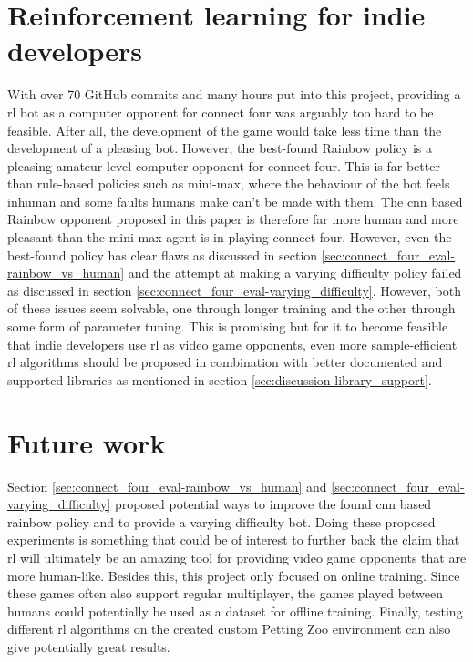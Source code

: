 \section{Reinforcement learning for indie developers}
\label{sec:discussion-rl_for_indie}

With over 70 GitHub commits and many hours put into this project, providing a \gls{rl} bot as a computer opponent for connect four was arguably too hard to be feasible.
After all, the development of the game would take less time than the development of a pleasing bot.
However, the best-found Rainbow policy is a pleasing amateur level computer opponent for connect four.
This is far better than rule-based policies such as mini-max, where the behaviour of the bot feels inhuman and some faults humans make can't be made with them.
The \gls{cnn} based Rainbow opponent proposed in this paper is therefore far more human and more pleasant than the mini-max agent is in playing connect four.
However, even the best-found policy has clear flaws as discussed in section \ref{sec:connect_four_eval-rainbow_vs_human} and the attempt at making a varying difficulty policy failed as discussed in section \ref{sec:connect_four_eval-varying_difficulty}.
However, both of these issues seem solvable, one through longer training and the other through some form of parameter tuning.
This is promising but for it to become feasible that indie developers use \gls{rl} as video game opponents, even more sample-efficient \gls{rl} algorithms should be proposed in combination with better documented and supported libraries as mentioned in section \ref{sec:discussion-library_support}.


\section{Future work}
\label{sec:discussion-future_work}

Section \ref{sec:connect_four_eval-rainbow_vs_human} and \ref{sec:connect_four_eval-varying_difficulty} proposed potential ways to improve the found \gls{cnn} based rainbow policy and to provide a varying difficulty bot.
Doing these proposed experiments is something that could be of interest to further back the claim that \gls{rl} will ultimately be an amazing tool for providing video game opponents that are more human-like.
Besides this, this project only focused on online training.
Since these games often also support regular multiplayer, the games played between humans could potentially be used as a dataset for offline training.
Finally, testing different \gls{rl} algorithms on the created custom Petting Zoo environment can also give potentially great results. 
